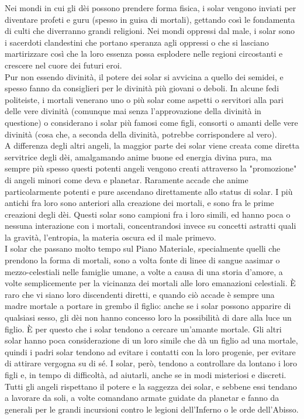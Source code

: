 \begin{multicols}{2}
Nei mondi in cui gli dèi possono prendere forma fisica, i solar vengono inviati per diventare profeti e guru (spesso in guisa di mortali), gettando così le fondamenta di culti che diverranno grandi religioni. Nei mondi oppressi dal male, i solar sono i sacerdoti clandestini che portano speranza agli oppressi o che si lasciano martirizzare così che la loro essenza possa esplodere nelle regioni circostanti e crescere nel cuore dei futuri eroi.\\
Pur non essendo divinità, il potere dei solar si avvicina a quello dei semidei, e spesso fanno da consiglieri per le divinità più giovani o deboli. In alcune fedi politeiste, i mortali venerano uno o più solar come aspetti o servitori alla pari delle vere divinità (comunque mai senza l'approvazione della divinità in questione) o considerano i solar più famosi come figli, consorti o amanti delle vere divinità (cosa che, a seconda della divinità, potrebbe corrispondere al vero).\\
A differenza degli altri angeli, la maggior parte dei solar viene creata come diretta servitrice degli dèi, amalgamando anime buone ed energia divina pura, ma sempre più spesso questi potenti angeli vengono creati attraverso la "promozione" di angeli minori come deva e planetar. Raramente accade che anime particolarmente potenti e pure ascendano direttamente allo status di solar. I più antichi fra loro sono anteriori alla creazione dei mortali, e sono fra le prime creazioni degli dèi. Questi solar sono campioni fra i loro simili, ed hanno poca o nessuna interazione con i mortali, concentrandosi invece su concetti astratti quali la gravità, l'entropia, la materia oscura ed il male primevo.\\
I solar che passano molto tempo sul Piano Materiale, specialmente quelli che prendono la forma di mortali, sono a volta fonte di linee di sangue aasimar o mezzo-celestiali nelle famiglie umane, a volte a causa di una storia d'amore, a volte semplicemente per la vicinanza dei mortali alle loro emanazioni celestiali. È raro che vi siano loro discendenti diretti, e quando ciò accade è sempre una madre mortale a portare in grembo il figlio: anche se i solar possono apparire di qualsiasi sesso, gli dèi non hanno concesso loro la possibilità di dare alla luce un figlio. È per questo che i solar tendono a cercare un'amante mortale. Gli altri solar hanno poca considerazione di un loro simile che dà un figlio ad una mortale, quindi i padri solar tendono ad evitare i contatti con la loro progenie, per evitare di attirare vergogna su di sé. I solar, però, tendono a controllare da lontano i loro figli e, in tempo di difficoltà, ad aiutarli, anche se in modi misteriosi e discreti.\\
Tutti gli angeli rispettano il potere e la saggezza dei solar, e sebbene essi tendano a lavorare da soli, a volte comandano armate guidate da planetar e fanno da generali per le grandi incursioni contro le legioni dell'Inferno o le orde dell'Abisso.\\



\end{multicols}
